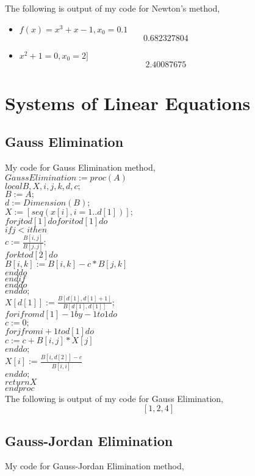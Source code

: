 \documentclass[12pt]{article}
\begin{document}
The following is output of my code for Newton's method,
\begin{itemize}
\item $f(x) = x^3+x-1, x_0 = 0.1$
$$0.682327804$$
\item $x^2+1 = 0, x_0 = 2]$
$$2.40087675$$
\end{itemize}
\clearpage
\section{Systems of Linear Equations}
\subsection{Gauss Elimination}
My code for Gauss Elimination method,\\

$GaussElimination := proc (A)$\\
$local B, X, i, j, k, d, c;$\\
$B := A;$\\
$d := Dimension(B);$\\
$X := [seq(x[i], i = 1 .. d[1])];$\\
$for j to d[1] do for i to d[1] do$\\
$if j < i then$\\
$c := \frac{B[i, j]}{B[j, j]};$\\
$for k to d[2] do$\\
$B[i, k] := B[i, k]-c*B[j, k]$\\
$end do$\\
$end if$\\
$end do$\\
$end do;$\\
$X[d[1]] := \frac{B[d[1], d[1]+1]}{B[d[1], d[1]]};$\\
$for i from d[1]-1 by -1 to 1 do$\\
$c := 0;$\\
$for j from i+1 to d[1] do$\\
$c := c+B[i, j]*X[j]$\\
$end do;$\\
$X[i] := \frac{B[i, d[2]]-c}{B[i, i]}$\\
$end do;$\\
$return X$\\
$end proc$\\

The following is output of my code for Gauss Elimination,
$$[1, 2, 4]$$
\subsection{Gauss-Jordan Elimination}
My code for Gauss-Jordan Elimination method,\\
\end{document}
